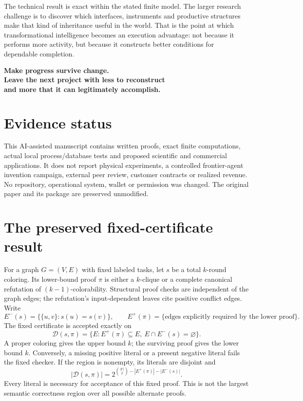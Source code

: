 \documentclass[11pt,letterpaper]{article}
\theoremstyle{definition}\newtheorem{definition}[theorem]{Definition}
\theoremstyle{remark}\newtheorem{remark}[theorem]{Remark}
\newcommand{\Dc}{\mathcal D}\newcommand{\Verify}{\mathsf{Verify}}
\begin{document}
The technical result is exact within the stated finite model. The larger research challenge is to discover which interfaces, instruments and productive structures make that kind of inheritance useful in the world. That is the point at which transformational intelligence becomes an execution advantage: not because it performs more activity, but because it constructs better conditions for dependable completion.

\begin{thesis}
\centering\large\bfseries
Make progress survive change.\\[.25em]
\normalsize Leave the next project with less to reconstruct\\and more that it can legitimately accomplish.
\end{thesis}

\section*{Evidence status}
This AI-assisted manuscript contains written proofs, exact finite computations, actual local process/database tests and proposed scientific and commercial applications. It does not report physical experiments, a controlled frontier-agent invention campaign, external peer review, customer contracts or realized revenue. No repository, operational system, wallet or permission was changed. The original paper and its package are preserved unmodified.

\clearpage\appendix
\section{The preserved fixed-certificate result}
\label{app:old}
For a graph $G=(V,E)$ with fixed labeled tasks, let $s$ be a total $k$-round coloring. Its lower-bound proof $\pi$ is either a $k$-clique or a complete canonical refutation of $(k-1)$-colorability. Structural proof checks are independent of the graph edges; the refutation's input-dependent leaves cite positive conflict edges. Write
\begin{equation}
 E^-(s)=\{\{u,v\}:s(u)=s(v)\},\qquad E^+(\pi)=\{\text{edges explicitly required by the lower proof}\}.
\end{equation}
The fixed certificate is accepted exactly on
\begin{equation}
 \Dc(s,\pi)=\{E:E^+(\pi)\subseteq E,\ E\cap E^-(s)=\varnothing\}.
 \label{eq:oldregion}
\end{equation}
A proper coloring gives the upper bound $k$; the surviving proof gives the lower bound $k$. Conversely, a missing positive literal or a present negative literal fails the fixed checker. If the region is nonempty, its literals are disjoint and
\begin{equation}
 |\Dc(s,\pi)|=2^{\binom{|V|}{2}-|E^+(\pi)|-|E^-(s)|}.
\end{equation}
Every literal is necessary for acceptance of this fixed proof. This is not the largest semantic correctness region over all possible alternate proofs.
\end{document}
